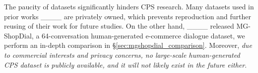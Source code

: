 The paucity of datasets significantly hinders CPS research. Many datasets used in prior works ____ are privately owned, which prevents reproduction and further reusing of their work for future studies.
On the other hand, ____ released MG-ShopDial, a 64-conversation human-generated e-commerce dialogue dataset, %
we perform an in-depth comparison in \S\ref{sec:mgshopdial_comparison}. Moreover, \textit{due to commercial interests and privacy concerns, no large-scale human-generated CPS dataset is publicly available, and it will not likely exist in the future either}. %


